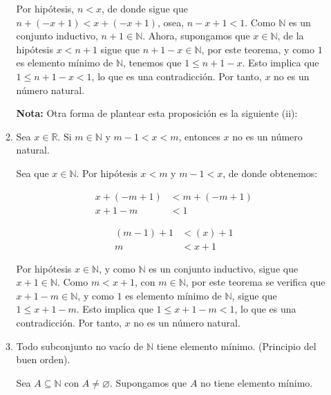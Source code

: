 \documentclass[11pt]{article}
\newcommand{\N}{\mathbb{N}}
\newcommand{\R}{\mathbb{R}}
\let\emptyset\varnothing
\let\subset\subseteq
\begin{document}
\begin{enumerate}[label=\alph*)]
\begin{enumerate}[label=\roman*)]
  Por hipótesis, $n<x$, de donde sigue que $n+(-x+1)<x+(-x+1)$, osea, $n-x+1<1$. Como $\N$ es un conjunto inductivo, $n+1\in \N$. Ahora, supongamos que $x\in \N$, de la hipótesis $x<n+1$ sigue que $n+1-x\in \N$, por este teorema, y como $1$ es elemento mínimo de $\N$, tenemos que $1\leq n+1-x$. Esto implica que $1\leq n+1-x < 1$, lo que es una contradicción. Por tanto, $x$ no es un número natural.

  \textbf{Nota:} Otra forma de plantear esta proposición es la siguiente (ii):

  \item Sea $x\in \R$. Si $m\in \N$ y $m-1<x<m$, entonces $x$ no es un número natural.
  
  Sea que $x\in \N$. Por hipótesis $x<m$ y $m-1<x$, de donde obtenemos:
  \begin{center}\vspace{-1em}
   \begin{minipage}[l]{.4\linewidth}
   \begin{align*}
    x +(-m+1) &< m +(-m+1)\\
    x+1-m &< 1
   \end{align*}
   \end{minipage}%
   \begin{minipage}[r]{.4\linewidth}
   \begin{align*}
    (m-1) +1 &< (x)+1\\
    m &< x+1
   \end{align*}
   \end{minipage}
  \end{center}
  Por hipótesis $x\in \N$, y como $\N$ es un conjunto inductivo, sigue que $x+1\in \N$. Como $m<x+1$, con $m\in \N$, por este teorema se verifica que $x+1-m \in \N$, y como $1$ es elemento mínimo de $\N$, sigue que $1\leq x+1-m$. Esto implica que $1\leq x+1-m<1$, lo que es una contradicción. Por tanto, $x$ no es un número natural.

  \item Todo subconjunto no vacío de $\N$ tiene elemento mínimo. (Principio del buen orden).
  
  Sea $A\subset \N$ con $A\neq \emptyset$. Supongamos que $A$ no tiene elemento mínimo.
  

\end{enumerate}
\end{enumerate}
\end{document}
